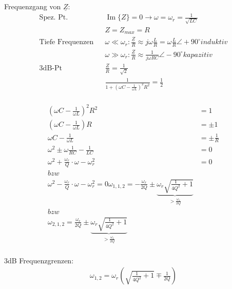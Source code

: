 Frequenzgang von $\underline Z$:\\
\begin{align}
	\text{Spez. Pt.}&&
	\operatorname{Im}{\{Z\}} = 0 \rightarrow \omega =
	\omega_r=\frac{1}{\sqrt{LC}}\nonumber\\ && Z = Z_{max} = R\nonumber\\
	\text{Tiefe Frequenzen} &&
	\omega \ll \omega_r: \frac{\underline Z}{R} \approx
	j\omega\frac{L}{R}=\omega\frac{L}{R} \angle +90^\circ induktiv\nonumber\\ && \omega \gg \omega_r: \frac{\underline Z}{R} \approx \frac{1}{j\omega RC}
	\angle -90^\circ kapazitiv\nonumber\\
	\text{3dB-Pt} &&
	\frac{Z}{R}=\frac{1}{\sqrt{2}}\nonumber\\
	&& \frac{1}{1+(\omega C-\frac{1}{\omega L})^2R^2}=\frac{1}{2}\nonumber
\end{align}\\

% 	


\begin{align}
	(\omega C-\frac{1}{\omega L})^2R^2 &= 1\nonumber\\
	(\omega C - \frac{1}{\omega L})R &= \pm 1\nonumber\\
	\omega C - \frac{1}{\omega L} &= \pm \frac{1}{R}\nonumber\\
	\omega^2 \pm \omega \frac{1}{RC}-\frac{1}{LC} &= 0\nonumber\\
	\omega^2 + \frac{\omega_r}{Q}\cdot \omega - \omega_r^2&=0 \\ bzw\\ \omega^2 -
	\frac{\omega_r}{Q}\cdot \omega - \omega_r^2=0\nonumber
	\omega_{1,1,2} = -\frac{\omega_r}{2Q} \pm 
	\underbrace{\omega_r\sqrt{\frac{1}{4Q^2}+1}}_{>\frac{\omega_r}{2Q}}
	\\	bzw \\
	\omega_{2,1,2}=\frac{\omega_r}{2Q} \pm
	\underbrace{\omega_r\sqrt{\frac{1}{4Q^2}+1}}_{>\frac{\omega_r}{2Q}} \nonumber\\
\end{align}


3dB Frequenzgrenzen:\\
\begin{align}
\boxed{\omega_{1,2}=\omega_r(\sqrt{\frac{1}{4Q^2}+1}\mp\frac{1}{2Q})}
\end{align}
